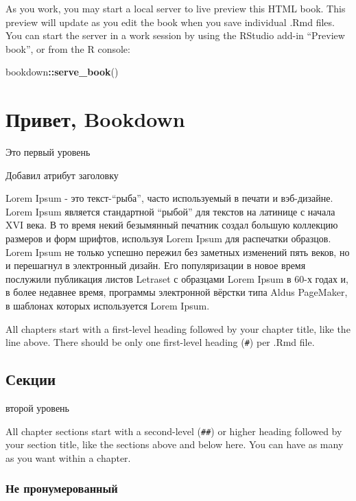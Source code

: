 \documentclass[
  12pt,
  a4paper,
]{book}
\newenvironment{Shaded}{\begin{snugshade}}{\end{snugshade}}
\newcommand{\FunctionTok}[1]{\textcolor[rgb]{0.13,0.29,0.53}{\textbf{#1}}}
\newcommand{\NormalTok}[1]{#1}
\newcommand{\SpecialCharTok}[1]{\textcolor[rgb]{0.81,0.36,0.00}{\textbf{#1}}}
\theoremstyle{definition}
\theoremstyle{definition}
\theoremstyle{definition}
\theoremstyle{definition}
\theoremstyle{remark}
\begin{document}
As you work, you may start a local server to live preview this HTML book. This preview will update as you edit the book when you save individual .Rmd files. You can start the server in a work session by using the RStudio add-in ``Preview book'', or from the R console:

\begin{Shaded}
\begin{Highlighting}[]
\NormalTok{bookdown}\SpecialCharTok{::}\FunctionTok{serve\_book}\NormalTok{()}
\end{Highlighting}
\end{Shaded}

\chapter{Привет, Bookdown}\label{intro}

Это первый уровень

Добавил атрибут заголовку

Lorem Ipsum - это текст-``рыба'', часто используемый в печати и вэб-дизайне. Lorem Ipsum является стандартной ``рыбой'' для текстов на латинице с начала XVI века. В то время некий безымянный печатник создал большую коллекцию размеров и форм шрифтов, используя Lorem Ipsum для распечатки образцов. Lorem Ipsum не только успешно пережил без заметных изменений пять веков, но и перешагнул в электронный дизайн. Его популяризации в новое время послужили публикация листов Letraset с образцами Lorem Ipsum в 60-х годах и, в более недавнее время, программы электронной вёрстки типа Aldus PageMaker, в шаблонах которых используется Lorem Ipsum.

All chapters start with a first-level heading followed by your chapter title, like the line above. There should be only one first-level heading (\texttt{\#}) per .Rmd file.

\section{Секции}\label{ux441ux435ux43aux446ux438ux438}

второй уровень

All chapter sections start with a second-level (\texttt{\#\#}) or higher heading followed by your section title, like the sections above and below here. You can have as many as you want within a chapter.

\subsection*{Не пронумерованный}\label{ux43dux435-ux43fux440ux43eux43dux443ux43cux435ux440ux43eux432ux430ux43dux43dux44bux439}
\end{document}
